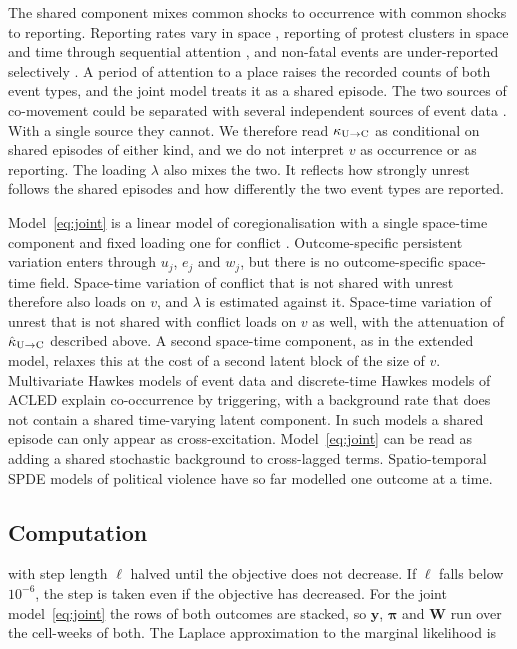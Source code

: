 The shared component mixes common shocks to occurrence with common shocks to
reporting. Reporting rates vary in space \citep{weidmann2016closer}, reporting of
protest clusters in space and time through sequential attention
\citep{hellmeier2018spotlight}, and non-fatal events are under-reported selectively
\citep{croicu2022reporting}. A period of attention to a place raises the recorded
counts of both event types, and the joint model treats it as a shared episode. The
two sources of co-movement could be separated with several independent sources of
event data \citep{cook2017twowrongs}. With a single source they cannot. We therefore
read $\kappa_{\mathrm{U}\to\mathrm{C}}$ as conditional on shared episodes of either kind, and we do not
interpret $v$ as occurrence or as reporting. The loading $\lambda$ also mixes the two.
It reflects how strongly unrest follows the shared episodes and how differently the
two event types are reported.

Model~\eqref{eq:joint} is a linear model of coregionalisation with a single
space-time component and fixed loading one for conflict
\citep{gelfand2004nonstationary}. Outcome-specific persistent variation enters
through $u_j$, $e_j$ and $w_j$, but there is no outcome-specific space-time field.
Space-time variation of conflict that is not shared with unrest therefore also loads
on $v$, and $\lambda$ is estimated against it. Space-time variation of unrest that is
not shared with conflict loads on $v$ as well, with the attenuation of $\hat\kappa_{\mathrm{U}\to\mathrm{C}}$
described above. A second space-time component, as in the extended model, relaxes
this at the cost of a second latent block of the size of $v$. Multivariate Hawkes
models of event data \citep{jun2024hawkes} and discrete-time Hawkes models of ACLED
\citep{browning2026hawkes} explain co-occurrence by triggering, with a background rate
that does not contain a shared time-varying latent component. In such models a shared
episode can only appear as cross-excitation. Model~\eqref{eq:joint} can be read as
adding a shared stochastic background to cross-lagged terms. Spatio-temporal SPDE
models of political violence \citep{python2019bayesian, egbon2024spatio} have so far
modelled one outcome at a time.

\subsection{Computation}\label{supp:methods-comp}

with step length $\ell$ halved until the objective does not decrease. If $\ell$ falls
below $10^{-6}$, the step is taken even if the objective has decreased. For the joint
model~\eqref{eq:joint} the rows of both outcomes are stacked, so $\bm{y}$, $\bm{\pi}$
and $\bm{W}$ run over the cell-weeks of both. The Laplace approximation to the marginal likelihood is

